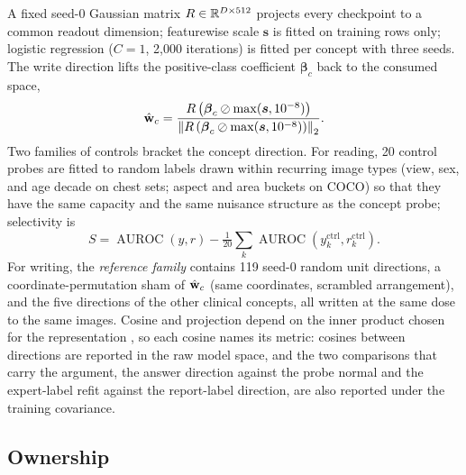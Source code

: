 \documentclass{article}
\begin{document}
A fixed seed-0 Gaussian matrix $R\in\mathbb{R}^{D\times512}$ projects every checkpoint to a common readout dimension; featurewise scale $\boldsymbol s$ is fitted on training rows only; logistic regression ($C=1$, 2{,}000 iterations) is fitted per concept with three seeds. The write direction lifts the positive-class coefficient $\boldsymbol\beta_c$ back to the consumed space,
\begin{equation}
\hat{\mathbf{w}}_c=\frac{R\left(\boldsymbol\beta_c\oslash\max(\boldsymbol s,10^{-8})\right)}{\left\lVert R\left(\boldsymbol\beta_c\oslash\max(\boldsymbol s,10^{-8})\right)\right\rVert_2}.
\label{eq:lift}
\end{equation}
Two families of controls bracket the concept direction. For reading, 20 control probes are fitted to random labels drawn within recurring image types (view, sex, and age decade on chest sets; aspect and area buckets on COCO) so that they have the same capacity and the same nuisance structure as the concept probe; selectivity is
\begin{equation}
S=\operatorname{AUROC}(y,r)-\tfrac{1}{20}\textstyle\sum_{k}\operatorname{AUROC}(y^{\mathrm{ctrl}}_k,r^{\mathrm{ctrl}}_k).
\label{eq:selectivity}
\end{equation}
For writing, the \emph{reference family} contains 119 seed-0 random unit directions, a coordinate-permutation sham of $\hat{\mathbf{w}}_c$ (same coordinates, scrambled arrangement), and the five directions of the other clinical concepts, all written at the same dose to the same images. Cosine and projection depend on the inner product chosen for the representation \citep{park2024linear}, so each cosine names its metric: cosines between directions are reported in the raw model space, and the two comparisons that carry the argument, the answer direction against the probe normal and the expert-label refit against the report-label direction, are also reported under the training covariance.

\subsection{Ownership}
\label{sec:ownership}
\end{document}
